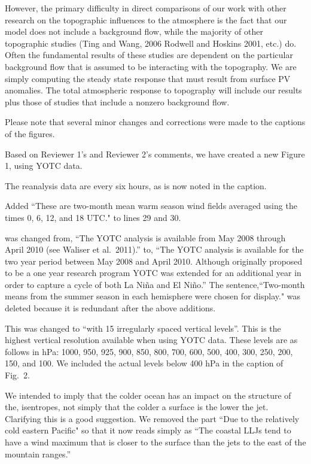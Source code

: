 \documentclass[11pt]{article}
\begin{document}
However, the primary difficulty in direct comparisons of our work with other research on the topographic influences 
to the atmosphere is the fact that our model does not include a background flow, while the majority of other 
topographic studies (Ting and Wang, 2006 Rodwell and Hoskins 2001, etc.) do.  Often the fundamental results of 
these studies are dependent on the particular background flow that is assumed to be interacting with the 
topography.  We are simply computing the steady state response that must result from surface PV anomalies.  
The total atmospheric response to topography will include our results plus those of studies that include a nonzero 
background flow.  

\bigskip
{}

Please note that several minor changes and corrections were made to the captions of the figures.  

\medskip
{} Based on Reviewer 1's and Reviewer 2's comments, we have created 
a new Figure 1, using YOTC data.  

\medskip
{} The reanalysis data are every six hours, as is now noted in the caption. 

\medskip
{}  Added ``These are two-month mean warm season wind fields averaged using the 
times 0, 6, 12, and 18 UTC."  to lines 29 and 30. 

\medskip
{} was changed from, ``The YOTC analysis is available from May 2008 through 
April 2010 (see Waliser et al.~2011).'' to, ``The YOTC analysis is available for the two year 
period between May 2008 and April 2010.  Although originally proposed to be a one year research 
program YOTC was extended for an additional year in order to capture a cycle of both La Ni\~na 
and El Ni\~no.'' The sentence,``Two-month means from the summer season in each hemisphere were 
chosen for display." was deleted because it is redundant after the above additions. 

\medskip 
{}  This was changed to ``with 15 irregularly spaced vertical levels''.  
This is the highest vertical resolution available when using YOTC data.  These levels are as 
follows in hPa: 1000, 950, 925, 900, 850, 800, 700, 600, 500, 400, 300, 250, 200, 150, and 100.  
We included the actual levels below 400 hPa in the caption of Fig.~2.

\medskip
{}  We intended to imply that the colder ocean has an impact on the structure of the,
isentropes, not simply that the colder a surface is the lower the jet.  Clarifying this is a good suggestion.  
We removed the part ``Due to the relatively cold eastern Pacific" so 
that it now reads simply as ``The coastal LLJs tend to have a wind maximum that is closer to the 
surface than the jets to the east of the mountain ranges.''
\end{document}
